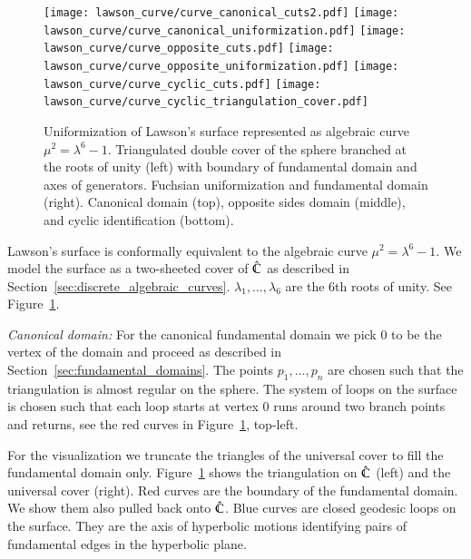 \documentclass[Thesis]{subfiles}
\begin{document}
\begin{figure}
	\centering
	\resizebox{!}{6cm} {
	\texttt{[image: lawson\_curve/curve\_canonical\_cuts2.pdf]}
	\texttt{[image: lawson\_curve/curve\_canonical\_uniformization.pdf]}
	}
	\resizebox{!}{6cm} {
	\texttt{[image: lawson\_curve/curve\_opposite\_cuts.pdf]}
	\texttt{[image: lawson\_curve/curve\_opposite\_uniformization.pdf]}
	}
	\resizebox{!}{6cm} {
	\texttt{[image: lawson\_curve/curve\_cyclic\_cuts.pdf]}
	\texttt{[image: lawson\_curve/curve\_cyclic\_triangulation\_cover.pdf]}
	}
	\caption{Uniformization of Lawson's surface represented as algebraic curve $\mu^2=\lambda^6-1$. Triangulated double cover of the sphere branched at the roots of unity (left) with boundary of fundamental domain and axes of generators. Fuchsian uniformization and fundamental domain (right). Canonical domain (top), opposite sides domain (middle), and cyclic identification (bottom).}
	\label{fig:lawson_curve}
\end{figure}

Lawson's surface is conformally equivalent to the algebraic curve $\mu^2=\lambda^6-1$.
We model the surface as a two-sheeted cover of $\hat {\mathbb C}$ as described in Section~\ref{sec:discrete_algebraic_curves}. $\lambda_1,\ldots,\lambda_6$ are the 6th roots of unity.
See Figure~\ref{fig:lawson_curve}.

\textit{Canonical domain:}
For the canonical fundamental domain we pick $0$ to be the vertex of the domain and proceed as described in Section~\ref{sec:fundamental_domains}.
The points $p_1,\ldots,p_n$ are chosen such that the triangulation is almost regular on the sphere.
The system of loops on the surface is chosen such that each loop starts at vertex $0$ runs around two branch points and returns, see the red curves in Figure~\ref{fig:lawson_curve}, top-left.

For the visualization we truncate the triangles of the universal cover to fill the fundamental domain only.
Figure~\ref{fig:lawson_curve} shows the triangulation on $\hat {\mathbb C}$ (left) and the universal cover (right).
Red curves are the boundary of the fundamental domain.
We show them also pulled back onto $\hat {\mathbb C}$. Blue curves are closed geodesic loops on the surface.
They are the axis of hyperbolic motions identifying pairs of fundamental edges in the hyperbolic plane.
\end{document}
